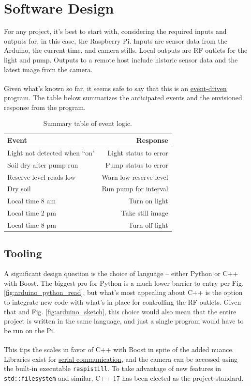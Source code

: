 \documentclass[]{article}
\begin{document}
\newpage

\section{Software Design}
For any project, it's best to start with, considering the required inputs and outputs for, in this case, the Raspberry Pi.  Inputs are sensor data from the Arduino, the current time, and camera stills.  Local outputs are RF outlets for the light and pump.  Outputs to a remote host include historic sensor data and the latest image from the camera.
\\\\
Given what's known so far, it seems safe to say that this is an \href{https://www.techopedia.com/definition/7083/event-driven-program}{event-driven program}.  The table below summarizes the anticipated events and the envisioned response from the program.
\begin{table}[h]
	\centering
	\caption{Summary table of event logic.}
	\label{tab:event_response}
	\begin{tabular}{l|r}
		\textbf{Event} & \textbf{Response} \\ \hline
		Light not detected when ``on" & Light status to error \\ \hline
		Soil dry after pump run & Pump status to error \\ \hline
		Reserve level reads low & Warn low reserve level \\ \hline
		Dry soil & Run pump for interval \\ \hline
		Local time 8 am & Turn on light \\ \hline
		Local time 2 pm & Take still image \\ \hline
		Local time 8 pm & Turn off light \\ \hline
	\end{tabular}	
\end{table}

\subsection{Tooling}
A significant design question is the choice of language -- either Python or C++ with Boost.  The biggest pro for Python is a much lower barrier to entry per Fig. \ref{fig:arduino_python_read}, but what's most appealing about C++ is the option to integrate new code with what's in place for controlling the RF outlets.  Given that and Fig. \ref{fig:arduino_sketch}, this choice would also mean that the entire project is written in the same language, and just a single program would have to be run on the Pi.  
\\\\
This tips the scales in favor of C++ with Boost in spite of the added nuance.  Libraries exist for \href{https://www.boost.org/doc/libs/1_65_0/doc/html/boost_asio/overview/serial_ports.html}{serial communication}, and the camera can be accessed using the built-in executable \verb|raspistill|.  To take advantage of new features in \verb|std::filesystem| and similar, C++ 17 has been elected as the project standard.
\end{document}
